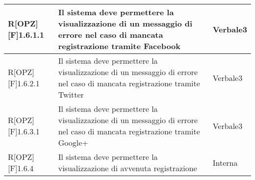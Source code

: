 \begin{table}[h]
\begin{tabular}{|p{}|p{}|p{}|}
R[OPZ][F]1.6.1.1 & Il sistema deve permettere la visualizzazione di un messaggio di errore nel caso di mancata registrazione tramite \gls{Facebook} & Verbale3 \\ \midrule
R[OPZ][F]1.6.2.1 & Il sistema deve permettere la visualizzazione di un messaggio di errore nel caso di mancata registrazione tramite Twitter & Verbale3 \\ \midrule
R[OPZ][F]1.6.3.1 & Il sistema deve permettere la visualizzazione di un messaggio di errore nel caso di mancata registrazione tramite Google+ & Verbale3 \\ \midrule
R[OPZ][F]1.6.4 & Il sistema deve permettere la visualizzazione di avvenuta registrazione  & Interna \\ \midrule

\end{tabular}
\end{table}
\newpage

